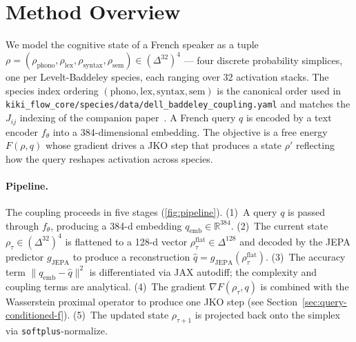 \section{Method Overview}
\label{sec:method-overview}

We model the cognitive state of a French speaker as a tuple
$\rho = (\rho_{\mathrm{phono}}, \rho_{\mathrm{lex}},
\rho_{\mathrm{syntax}}, \rho_{\mathrm{sem}}) \in (\Delta^{32})^4$
--- four discrete probability simplices, one per Levelt-Baddeley
species, each ranging over 32 activation stacks. The species index
ordering $(\mathrm{phono}, \mathrm{lex}, \mathrm{syntax},
\mathrm{sem})$ is the canonical order used in
\texttt{kiki\_flow\_core/species/data/dell\_baddeley\_coupling.yaml}
and matches the $J_{ij}$ indexing of the companion
paper~\cite{saillant2026kikiflow}. A French query
$q$ is encoded by a text encoder $f_\theta$ into a 384-dimensional
embedding. The objective is a free energy $F(\rho, q)$ whose
gradient drives a JKO step that produces a state $\rho'$
reflecting how the query reshapes activation across species.

\paragraph{Pipeline.} The coupling proceeds in five stages
(\cref{fig:pipeline}). (1)~A query $q$ is passed through
$f_\theta$, producing a 384-d embedding
$q_{\mathrm{emb}} \in \mathbb{R}^{384}$. (2)~The current state
$\rho_\tau \in (\Delta^{32})^4$ is flattened to a 128-d vector
$\rho_\tau^{\mathrm{flat}} \in \Delta^{128}$ and decoded by the
JEPA predictor $g_{\mathrm{JEPA}}$ to produce a reconstruction
$\hat{q} = g_{\mathrm{JEPA}}(\rho_\tau^{\mathrm{flat}})$.
(3)~The accuracy term
$\|q_{\mathrm{emb}} - \hat{q}\|^2$ is differentiated via JAX
autodiff; the complexity and coupling terms are analytical.
(4)~The gradient $\nabla F(\rho_\tau, q)$ is combined with the
Wasserstein proximal operator to produce one JKO step (see
Section~\ref{sec:query-conditioned-f}). (5)~The updated state
$\rho_{\tau+1}$ is projected back onto the simplex via
\texttt{softplus}-normalize.

